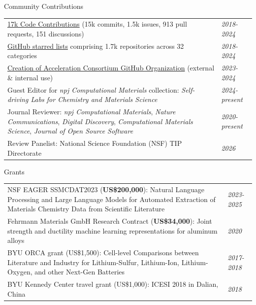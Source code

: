 \documentclass{resume} %
\begin{document}
\begin{rSection}{Community Contributions}
\renewcommand{\arraystretch}{1.5}
\begin{tabular}{m{13.9cm} m{2.3cm}}
{\href{https://github.com/sgbaird}{17k Code Contributions} (15k commits, 1.5k issues, 913 pull requests, 151 discussions)} & {\em \hfill 2018-2024} \\
{\href{https://github.com/sgbaird?tab=stars}{GitHub starred lists} comprising 1.7k repositories across 32 categories} & {\em \hfill 2018-2024} \\
{\href{https://github.com/AccelerationConsortium}{Creation of Acceleration Consortium GitHub Organization} (external \& internal use)} & {\em \hfill 2023-2024} \\
{Guest Editor for \textit{npj Computational Materials} collection: \textit{Self-driving Labs for Chemistry and Materials Science}} & {\em \hfill 2024-present} \\
{Journal Reviewer: \textit{npj Computational Materials}, \textit{Nature Communications}, \textit{Digital Discovery}, \textit{Computational Materials Science}, \textit{Journal of Open Source Software}} & {\em \hfill 2020-present} \\
{Review Panelist: National Science Foundation (NSF) TIP Directorate} & {\em \hfill 2026} \\
\end{tabular}
\end{rSection}

\begin{rSection}{Grants}
\renewcommand{\arraystretch}{1.5}
\begin{tabular}{m{14.2cm} m{2.1cm}}
{NSF EAGER SSMCDAT2023 (\textbf{US\$200,000}): Natural Language Processing and Large Language Models for Automated Extraction of Materials Chemistry Data from Scientific Literature} & {\em \hfill 2023-2025} \\
Fehrmann Materials GmbH Research Contract (\textbf{US\$34,000}): Joint strength and ductility machine learning representations for aluminum alloys & {\em \hfill 2020} \\
BYU ORCA grant (US\$1,500): Cell-level Comparisons between Literature and Industry for Lithium-Sulfur, Lithium-Ion, Lithium-Oxygen, and other Next-Gen Batteries & {\em \hfill 2017-2018} \\
BYU Kennedy Center travel grant (US\$1,000): ICESI 2018 in Dalian, China & {\em \hfill 2018} \\
\end{tabular}
\end{rSection}
\end{document}
